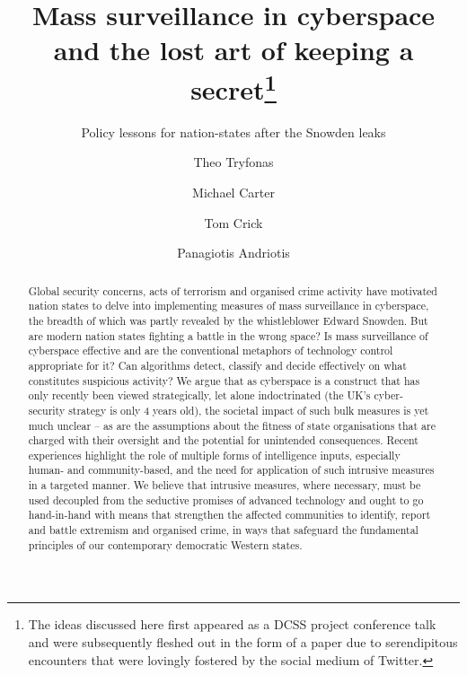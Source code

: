 \documentclass{llncs}
\begin{document}
\title{Mass surveillance in cyberspace and the lost art of keeping a secret\thanks{The ideas discussed here first appeared as a DCSS project conference talk and were subsequently fleshed out in the form of a paper due to serendipitous encounters that were lovingly fostered by the social medium of Twitter.}}
\subtitle{Policy lessons for nation-states after the Snowden leaks}

\author{Theo Tryfonas \and Michael Carter \and Tom Crick \and Panagiotis Andriotis}

\maketitle

\begin{abstract}
Global security concerns, acts of terrorism and organised crime activity have motivated nation states to delve into implementing measures of mass surveillance in cyberspace, the breadth of which was partly revealed by the whistleblower Edward Snowden. But are modern nation states fighting a battle in the wrong space? Is mass surveillance of cyberspace effective and are the conventional metaphors of technology control appropriate for it? Can algorithms detect, classify and decide effectively on what constitutes suspicious activity? We argue that as cyberspace is a construct that has only recently been viewed strategically, let alone indoctrinated (the UK’s cyber-security strategy is only 4 years old), the societal impact of such bulk measures is yet much unclear – as are the assumptions about the fitness of state organisations that are charged with their oversight and the potential for unintended consequences. Recent experiences highlight the role of multiple forms of intelligence inputs, especially human- and community-based, and the need for application of such intrusive measures in a targeted manner. We believe that intrusive measures, where necessary, must be used decoupled from the seductive promises of advanced technology and ought to go hand-in-hand with means that strengthen the affected communities to identify, report and battle extremism and organised crime, in ways that safeguard the fundamental principles of our contemporary democratic Western states.
\end{abstract}
\end{document}
